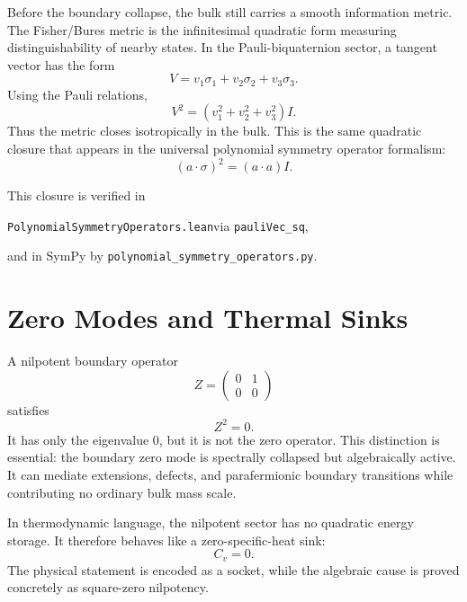 Before the boundary collapse, the bulk still carries a smooth information metric.  The Fisher/Bures metric is the infinitesimal quadratic form measuring distinguishability of nearby states.  In the Pauli-biquaternion sector, a tangent vector has the form
\begin{equation}
    V=v_1\sigma_1+v_2\sigma_2+v_3\sigma_3.
\end{equation}
Using the Pauli relations,
\begin{equation}
    V^2=(v_1^2+v_2^2+v_3^2)I.
\end{equation}
Thus the metric closes isotropically in the bulk.  This is the same quadratic closure that appears in the universal polynomial symmetry operator formalism:
\begin{equation}
    (a\cdot\sigma)^2=(a\cdot a)I.
\end{equation}

This closure is verified in
\begin{center}
\texttt{PolynomialSymmetryOperators.lean}\quad via \quad\texttt{pauliVec\_sq},
\end{center}
and in SymPy by \texttt{polynomial\_symmetry\_operators.py}.

\section{Zero Modes and Thermal Sinks}

A nilpotent boundary operator
\begin{equation}
    Z=\begin{pmatrix}0&1\\0&0\end{pmatrix}
\end{equation}
satisfies
\begin{equation}
    Z^2=0.
\end{equation}
It has only the eigenvalue $0$, but it is not the zero operator.  This distinction is essential: the boundary zero mode is spectrally collapsed but algebraically active.  It can mediate extensions, defects, and parafermionic boundary transitions while contributing no ordinary bulk mass scale.

In thermodynamic language, the nilpotent sector has no quadratic energy storage.  It therefore behaves like a zero-specific-heat sink:
\begin{equation}
    C_v=0.
\end{equation}
The physical statement is encoded as a socket, while the algebraic cause is proved concretely as square-zero nilpotency.

